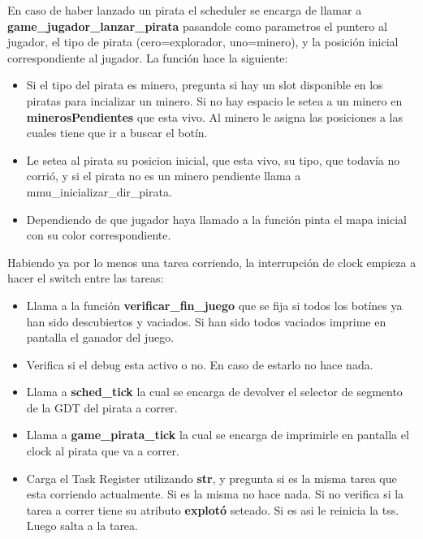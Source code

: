 \documentclass[a4paper,10pt]{article}
\begin{document}
  En caso de haber lanzado un pirata el scheduler se encarga de llamar a \textbf{game\_jugador\_lanzar\_pirata}
  pasandole como parametros el puntero al jugador, el tipo de pirata (cero=explorador, uno=minero), y la posición inicial correspondiente al jugador.
  La función hace la siguiente:
  \begin{itemize}
    \item Si el tipo del pirata es minero, pregunta si hay un slot disponible en los piratas para incializar un minero.
      Si no hay espacio le setea a un minero en \textbf{minerosPendientes} que esta vivo. Al minero le asigna 
      las posiciones a las cuales tiene que ir a buscar el botín.
    \item Le setea al pirata su posicion inicial, que esta vivo, su tipo, que todavía no corrió, y si el pirata no es un minero pendiente
      llama a mmu\_inicializar\_dir\_pirata.
    \item Dependiendo de que jugador haya llamado a la función pinta el mapa inicial con su color correspondiente. 
  \end{itemize}

  Habiendo ya por lo menos una tarea corriendo, la interrupción de clock empieza a hacer el switch entre las tareas:
  \begin{itemize}
    \item Llama a la función \textbf{verificar\_fin\_juego} que se fija si todos los botínes
      ya han sido descubiertos y vaciados. Si han sido todos vaciados imprime en pantalla el ganador del juego.
    \item Verifica si el debug esta activo o no. En caso de estarlo no hace nada.
    \item Llama a \textbf{sched\_tick} la cual se encarga de devolver el selector de segmento de la GDT del pirata a correr.
    \item Llama a \textbf{game\_pirata\_tick} la cual se encarga de imprimirle en pantalla el clock al pirata que va a correr.
    \item Carga el Task Register utilizando \textbf{str}, y pregunta si es la misma tarea que esta corriendo actualmente.
      Si es la misma no hace nada. Si no verifica si la tarea a correr tiene su atributo \textbf{explotó} seteado.
      Si es asi le reinicia la tss. Luego salta a la tarea.
  \end{itemize}
\end{document}
